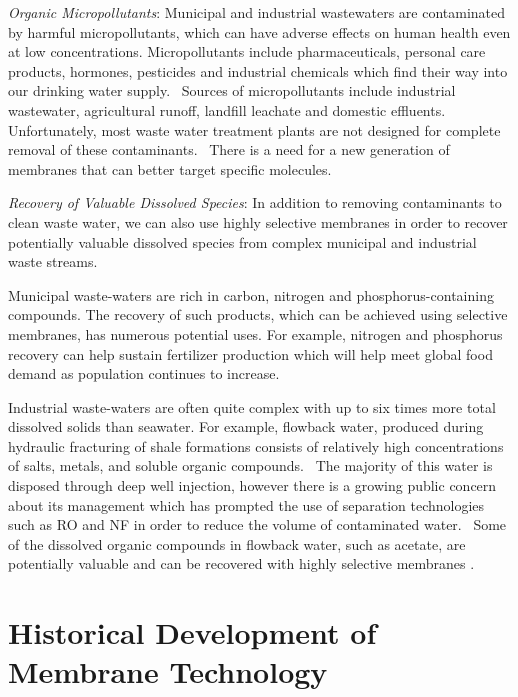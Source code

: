  \textit{Organic Micropollutants}: Municipal and industrial wastewaters are contaminated
  by harmful micropollutants, which can have adverse effects on human health even at low 
  concentrations.\cite{schwarzenbach_challenge_2006} Micropollutants include pharmaceuticals,
  personal care products, hormones, pesticides and industrial chemicals which find their way
  into our drinking water supply.~\cite{barbosa_occurrence_2016} Sources of micropollutants
  include industrial wastewater, agricultural runoff, landfill leachate and domestic 
  effluents.~\cite{mompelat_occurrence_2009} Unfortunately, most waste water treatment 
  plants are not designed for complete removal of these contaminants.~\cite{tijani_review_2013}
  There is a need for a new generation of membranes that can better target specific molecules.
  
  \textit{Recovery of Valuable Dissolved Species}: In addition to removing contaminants 
  to clean waste water, we can also use highly selective membranes in order to recover
  potentially valuable dissolved species from complex municipal and industrial waste
  streams.~\cite{guest_new_2009,daigger_evolving_2009}
  
  Municipal waste-waters are rich in carbon, nitrogen and phosphorus-containing 
  compounds. The recovery of such products, which can be 
  achieved using selective membranes, has numerous potential uses.\cite{romero_raw_2013,sales_resource_2015}
  For example, nitrogen and phosphorus recovery can help sustain fertilizer 
  production which will help meet global food demand as population continues
  to increase.\cite{xie_membrane-based_2016}

  Industrial waste-waters are often quite complex with up to six times more 
  total dissolved solids than seawater.\cite{werber_materials_2016} For example,
  flowback water, produced during hydraulic fracturing of shale formations consists
  of relatively high concentrations of salts, metals, and soluble organic 
  compounds.~\cite{orem_organic_2014} The majority of this water is disposed 
  through deep well injection, however there is a growing public concern about
  its management which has prompted the use of separation technologies such as 
  RO and NF in order to reduce the volume of contaminated water.~\cite{gregory_water_2011}
  Some of the dissolved organic compounds in flowback water, such as acetate, 
  are potentially valuable and can be recovered with highly selective membranes
  \cite{dischinger_application_2017}.

  \section{Historical Development of Membrane Technology}
  
